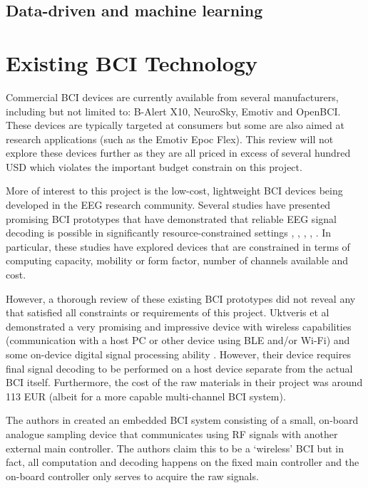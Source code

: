 \subsection{Data-driven and machine learning}

\section{Existing BCI Technology}
Commercial BCI devices are currently available from several manufacturers, including but not limited to: B-Alert X10, NeuroSky, Emotiv and OpenBCI. These devices are typically targeted at consumers but some are also aimed at research applications (such as the Emotiv Epoc Flex). This review will not explore these devices further as they are all priced in excess of several hundred USD which violates the important budget constrain on this project.

More of interest to this project is the low-cost, lightweight BCI devices being developed in the EEG research community. Several studies have presented promising BCI prototypes that have demonstrated that reliable EEG signal decoding is possible in significantly resource-constrained settings \cite{uktveris-modular-bci}, \cite{de-vos-p300-speller}, \cite{liao-gaming-control}, \cite{chai-embedded-bci}, \cite{acampora-svm-clf}. In particular, these studies have explored devices that are constrained in terms of computing capacity, mobility or form factor, number of channels available and cost. 

However, a thorough review of these existing BCI prototypes did not reveal any that satisfied all constraints or requirements of this project. Uktveris et al demonstrated a very promising and impressive device with wireless capabilities (communication with a host PC or other device using BLE and/or Wi-Fi) and some on-device digital signal processing ability \cite{uktveris-modular-bci}. However, their device requires final signal decoding to be performed on a host device separate from the actual BCI itself. Furthermore, the cost of the raw materials in their project was around 113 EUR \cite{uktveris-modular-bci} (albeit for a more capable multi-channel BCI system).

The authors in \cite{chai-embedded-bci} created an embedded BCI system consisting of a small, on-board analogue sampling device that communicates using RF signals with another external main controller. The authors claim this to be a `wireless' BCI but in fact, all computation and decoding happens on the fixed main controller and the on-board controller only serves to acquire the raw signals. 

